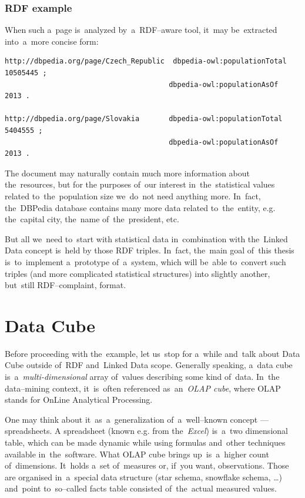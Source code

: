\subsubsection{RDF example}

When such a~page is~analyzed by~a~RDF--aware tool, it~may be~extracted into~a~more concise form:

\scriptsize\begin{verbatim}
http://dbpedia.org/page/Czech_Republic	dbpedia-owl:populationTotal		10505445 ;
                                       dbpedia-owl:populationAsOf		2013 .

http://dbpedia.org/page/Slovakia       dbpedia-owl:populationTotal		5404555 ;
                                       dbpedia-owl:populationAsOf		2013 .
\end{verbatim}\normalsize

The document may naturally contain much more information about the~resources, but for the
purposes of~our interest in~the~statistical values related to~the~population size we~do~not
need anything more. In~fact, the~DBPedia database contains many more data related to~the~entity,
e.g. the~capital city, the~name of~the~president, etc.

But all we~need to~start with statistical data in~combination with the~Linked Data concept is~held
by those RDF triples. In~fact, the~main goal of~this thesis is~to~implement a~prototype of~a~system, which will be~able to~convert such triples (and more complicated statistical structures) into
slightly another, but~still RDF--complaint, format.

\section{Data Cube}
\label{sec:datacube}
Before proceeding with the~example, let us~stop for a~while and~talk about Data Cube outside
of~RDF and~Linked Data scope. Generally speaking, a~data cube is~a~\emph{multi-dimensional}
 array of~values describing some kind of~data. In~the
data--mining context, it~is~often referenced as~an~\emph{OLAP cube}, where OLAP stands for OnLine
Analytical Processing.

One may think about it~as~a~generalization of~a~well--known concept --- spreadsheets.
A spreadsheet (known e.g. from the~\emph{Excel}) is~a~two dimensional table, which can be
made dynamic while using formulas and~other techniques available in~the~software. What
OLAP cube brings up~is~a~higher count of~dimensions. It~holds a~set of~measures or, if~you
want, observations. Those are organised in~a~special data structure (star schema, snowflake
schema, …) and~point to~so--called facts table consisted of~the~actual measured values.

